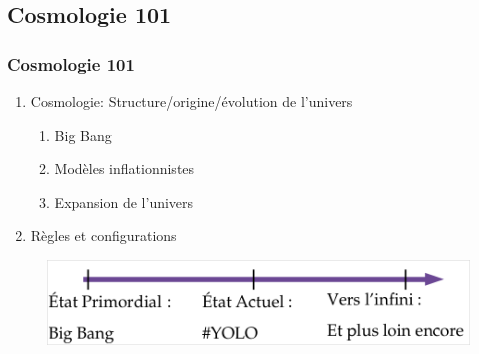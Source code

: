 \documentclass[handout]{beamer}
\begin{document}
\subsection{Cosmologie 101}
\begin{frame}
\frametitle{Cosmologie 101}
\begin{enumerate}
\item Cosmologie: Structure/origine/évolution de l'univers
\begin{enumerate}
\item Big Bang
\item Modèles inflationnistes
\item Expansion de l'univers
\end{enumerate}
\item Règles et configurations 
\end{enumerate}
 \begin{figure}
  \includegraphics[scale=0.3]{yolo.png}
 \end{figure}
\end{frame}


\end{document}
